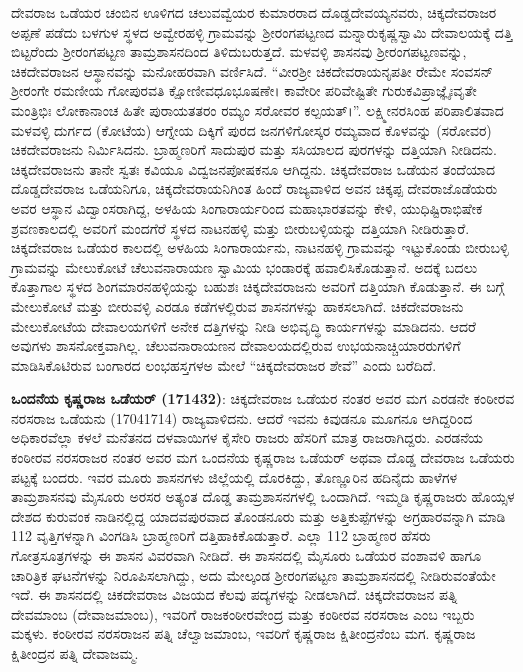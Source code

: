 ದೇವರಾಜ ಒಡೆಯರ ಚಂಬಿನ ಊಳಿಗದ ಚಲುವವ್ವೆಯರ ಕುಮಾರರಾದ ದೊಡ್ಡದೇವಯ್ಯನವರು, ಚಿಕ್ಕದೇವರಾಜರ ಅಪ್ಪಣೆ ಪಡೆದು ಬಳಗುಳ ಸ್ಥಳದ ಅವ್ವೇರಹಳ್ಳಿ ಗ್ರಾಮವನ್ನು ಶ‍್ರೀರಂಗಪಟ್ಟಣದ ಮನ್ನಾರುಕೃಷ್ಣಸ್ವಾಮಿ ದೇವಾಲಯಕ್ಕೆ ದತ್ತಿ ಬಿಟ್ಟರೆಂದು ಶ‍್ರೀರಂಗಪಟ್ಟಣ ತಾಮ್ರಶಾಸನದಿಂದ ತಿಳಿದುಬರುತ್ತದೆ. ಮಳವಳ್ಳಿ ಶಾಸನವು ಶ‍್ರೀರಂಗಪಟ್ಟಣವನ್ನು, ಚಿಕದೇವರಾಜನ ಆಸ್ಥಾನವನ್ನು ಮನೋಹರವಾಗಿ ವರ್ಣಿಸಿದೆ. “ವೀರಶ‍್ರೀ ಚಿಕದೇವರಾಯನೃಪತೀ ರೇಮೇ ಸಂವಸನ್​ ಶ‍್ರೀರಂಗೇ ರಮಣೀಯ ಗೋಪುರವತಿ ಕ್ಷೋಣೀವಧೂಭೂಷಣೇ। ಕಾವೇರೀ ಪರಿವೇಷ್ಟಿತೇ ಗುರುಕವಿಪ್ರಾಜ್ಞೈಃವೃತೇ ಮಂತ್ರಿಭಿಃ ಲೋಕಾನಾಂಚ ಹಿತೇ ಪುರಾಯತತರಂ ರಮ್ಯಂ ಸರೋವರ ಕಲ್ಪಯತ್​।”. ಲಕ್ಷ್ಮೀನರಸಿಂಹ ಪರಿಪಾಲಿತವಾದ ಮಳವಳ್ಳಿ ದುರ್ಗದ (ಕೋಟೆಯ) ಆಗ್ನೇಯ ದಿಕ್ಕಿಗೆ ಪುರದ ಜನಗಳಿಗೋಸ್ಕರ ರಮ್ಯವಾದ ಕೊಳವನ್ನು (ಸರೋವರ) ಚಿಕದೇವರಾಜನು ನಿರ್ಮಿಸಿದನು. ಬ್ರಾಹ್ಮಣರಿಗೆ ಸಾದುಪುರ ಮತ್ತು ಸಸಿಯಾಲದ ಪುರಗಳನ್ನು ದತ್ತಿಯಾಗಿ ನೀಡಿದನು. ಚಿಕ್ಕದೇವರಾಜನು ತಾನೇ ಸ್ವತಃ ಕವಿಯೂ ವಿದ್ವಜನಪೋಷಕನೂ ಆಗಿದ್ದನು. ಚಿಕ್ಕದೇವರಾಜ ಒಡೆಯನ ತಂದೆಯಾದ ದೊಡ್ಡದೇವರಾಜ ಒಡೆಯನಿಗೂ, ಚಿಕ್ಕದೇವರಾಯನಿಗಿಂತ ಹಿಂದೆ ರಾಜ್ಯವಾಳಿದ ಅವನ ಚಿಕ್ಕಪ್ಪ ದೇವರಾಜೊಡೆಯರು ಅವರ ಆಸ್ಥಾನ ವಿದ್ವಾಂಸರಾಗಿದ್ದ, ಅಳಹಿಯ ಸಿಂಗಾರಾರ್ಯರಿಂದ ಮಹಾಭಾರತವನ್ನು ಕೇಳಿ, ಯುಧಿಷ್ಟಿರಾಭಿಷೇಕ ಶ್ರವಣಕಾಲದಲ್ಲಿ ಅವರಿಗೆ ಮಂದಗೆರೆ ಸ್ಥಳದ ನಾಟನಹಳ್ಳಿ ಮತ್ತು ಬೀರುಬಳ್ಳಿಯನ್ನು ದತ್ತಿಯಾಗಿ ನೀಡಿರುತ್ತಾರೆ. ಚಿಕ್ಕದೇವರಾಜ ಒಡೆಯರ ಕಾಲದಲ್ಲಿ ಅಳಹಿಯ ಸಿಂಗಾರಾರ್ಯನು, ನಾಟನಹಳ್ಳಿ ಗ್ರಾಮವನ್ನು ಇಟ್ಟುಕೊಂಡು ಬೀರುಬಳ್ಳಿ ಗ್ರಾಮವನ್ನು ಮೇಲುಕೋಟೆ ಚೆಲುವನಾರಾಯಣ ಸ್ವಾಮಿಯ ಭಂಡಾರಕ್ಕೆ ಹವಾಲಿಸಿಕೊಡುತ್ತಾನೆ. ಅದಕ್ಕೆ ಬದಲು ಕೊತ್ತಾಗಾಲ ಸ್ಥಳದ ಶಿಂಗಮಾರನಹಳ್ಳಿಯನ್ನು ಬಹುಶಃ ಚಿಕ್ಕದೇವರಾಜನು ಅವರಿಗೆ ದತ್ತಿಯಾಗಿ ಕೊಡುತ್ತಾನೆ. ಈ ಬಗ್ಗೆ ಮೇಲುಕೋಟೆ ಮತ್ತು ಬೀರುವಳ್ಳಿ ಎರಡೂ ಕಡೆಗಳಲ್ಲಿರುವ ಶಾಸನಗಳನ್ನು ಹಾಕಸಲಾಗಿದೆ. ಚಿಕದೇವರಾಜನು ಮೇಲುಕೋಟೆಯ ದೇವಾಲಯಗಳಿಗೆ ಅನೇಕ ದತ್ತಿಗಳನ್ನು ನೀಡಿ ಅಭಿವೃದ್ಧಿ ಕಾರ್ಯಗಳನ್ನು ಮಾಡಿದನು. ಆದರೆ ಅವುಗಳು ಶಾಸನೋಕ್ತವಾಗಿಲ್ಲ. ಚೆಲುವನಾರಾಯಣನ ದೇವಾಲಯದಲ್ಲಿರುವ ಉಭಯನಾಚ್ಚಿಯಾರರುಗಳಿಗೆ ಮಾಡಿಸಿಕೊಟಿರುವ ಬಂಗಾರದ ಲಂಭಹಸ್ತಗಳಅ ಮೇಲೆ “ಚಿಕ್ಕದೇವರಾಜರ ಶೇವೆ” ಎಂದು ಬರೆದಿದೆ.

\textbf{ ಒಂದನೆಯ ಕೃಷ್ಣರಾಜ ಒಡೆಯರ್​ (171432)}: ಚಿಕ್ಕದೇವರಾಜ ಒಡೆಯರ ನಂತರ ಅವರ ಮಗ ಎರಡನೇ ಕಂಠೀರವ ನರಸರಾಜ ಒಡೆಯನು (17041714) ರಾಜ್ಯವಾಳಿದನು. ಆದರೆ ಇವನು ಕಿವುಡನೂ ಮೂಗನೂ ಆಗಿದ್ದರಿಂದ ಅಧಿಕಾರವೆಲ್ಲಾ ಕಳಲೆ ಮನೆತನದ ದಳವಾಯಿಗಳ ಕೈಸೇರಿ ರಾಜರು ಹೆಸರಿಗೆ ಮಾತ್ರ ರಾಜರಾಗಿದ್ದರು. ಎರಡನೆಯ ಕಂಠೀರವ ನರಸರಾಜರ ನಂತರ ಅವರ ಮಗ ಒಂದನೆಯ ಕೃಷ್ಣರಾಜ ಒಡೆಯರ್​ ಅಥವಾ ದೊಡ್ಡ ದೇವರಾಜ ಒಡೆಯರು ಪಟ್ಟಕ್ಕೆ ಬಂದರು. ಇವರ ಮೂರು ಶಾಸನಗಳು ಜಿಲ್ಲೆಯಲ್ಲಿ ದೊರಕಿದ್ದು, ತೊಣ್ಣೂರಿನ ಹದಿನೈದು ಹಾಳೆಗಳ ತಾಮ್ರಶಾಸನವು ಮೈಸೂರು ಅರಸರ ಅತ್ಯಂತ ದೊಡ್ಡ ತಾಮ್ರಶಾಸನಗಳಲ್ಲಿ ಒಂದಾಗಿದೆ. ಇಮ್ಮಡಿ ಕೃಷ್ಣರಾಜರು ಹೊಯ್ಸಳ ದೇಶದ ಕುರುವಂಕ ನಾಡಿನಲ್ಲಿದ್ದ ಯಾದವಪುರವಾದ ತೊಂಡನೂರು ಮತ್ತು ಅತ್ತಿಕುಪ್ಪೆಗಳನ್ನು ಅಗ್ರಹಾರವನ್ನಾಗಿ ಮಾಡಿ 112 ವೃತ್ತಿಗಳನ್ನಾಗಿ ವಿಂಗಡಿಸಿ ಬ್ರಾಹ್ಮಣರಿಗೆ ದತ್ತಿಹಾಕಿಕೊಡುತ್ತಾರೆ. ಎಲ್ಲಾ 112 ಬ್ರಾಹ್ಮಣರ ಹೆಸರು ಗೋತ್ರಸೂತ್ರಗಳನ್ನು ಈ ಶಾಸನ ವಿವರವಾಗಿ ನೀಡಿದೆ. ಈ ಶಾಸನದಲ್ಲಿ ಮೈಸೂರು ಒಡೆಯರ ವಂಶಾವಳಿ ಹಾಗೂ ಚಾರಿತ್ರಿಕ ಘಟನೆಗಳನ್ನು ನಿರೂಪಿಸಲಾಗಿದ್ದು, ಅದು ಮೇಲ್ಕಂಡ ಶ‍್ರೀರಂಗಪಟ್ಟಣ ತಾಮ್ರಶಾಸನದಲ್ಲಿ ನೀಡಿರುವಂತೆಯೇ ಇದೆ. ಈ ಶಾಸನದಲ್ಲಿ ಚಿಕದೇವರಾಜ ವಿಜಯದ ಕೆಲವು ಪದ್ಯಗಳನ್ನು ನೀಡಲಾಗಿದೆ. ಚಿಕ್ಕದೇವರಾಜನ ಪತ್ನಿ ದೇವಮಾಂಬ (ದೇವಾಜಮಾಂಬ), ಇವರಿಗೆ ರಾಜಕಂಠೀರವೇಂದ್ರ ಮತ್ತು ಕಂಠೀರವ ನರಸರಾಜ ಎಂಬ ಇಬ್ಬರು ಮಕ್ಕಳು. ಕಂಠೀರವ ನರಸರಾಜನ ಪತ್ನಿ ಚೆಲ್ವಾಜಮಾಂಬ, ಇವರಿಗೆ ಕೃಷ್ಣರಾಜ ಕ್ಷಿತೀಂದ್ರನೆಂಬ ಮಗ. ಕೃಷ್ಣರಾಜ ಕ್ಷಿತೀಂದ್ರನ ಪತ್ನಿ ದೇವಾಜಮ್ಮ. 


